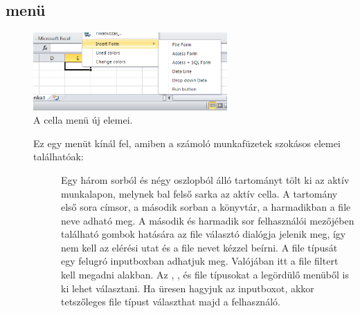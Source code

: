 \subsection{ menü}

\begin{figure}[h]
  \centering
  \includegraphics[width=20em]{images/cella-menu}
  \caption{A cella menü új elemei.}
  \label{fig:3.2}
\end{figure}

\begin{description}
\item[] Ez egy menüt kínál fel, amiben a számoló
  munkafüzetek szokásos elemei találhatóak: 

  \begin{description}
  \item[] Egy három sorból és négy oszlopból álló tartományt
    tölt ki az aktív munkalapon, melynek bal felső sarka az aktív
    cella. A tartomány első sora címsor, a  második sorban a
    könyvtár, a harmadikban a file neve adható meg. A második és
    harmadik sor felhasználói mezőjében található gombok hatására az
     file választó dialógja jelenik meg, így nem kell az
    elérési utat és a file nevet kézzel beírni.  A file típusát egy
    felugró inputboxban adhatjuk meg. Valójában itt a file filtert
    kell megadni  alakban. Az ,
    , és  
    file típusokat a legördülő menüből is ki lehet választani. Ha
    üresen hagyjuk az inputboxot, akkor  tetszőleges file típust
    választhat majd a felhasználó.  


\end{description}
\end{description}
